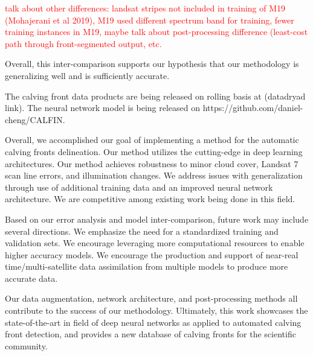 \documentclass[tc, manuscript]{copernicus}
\begin{document}
\textcolor{red}{talk about other differences: landsat stripes not included in training of M19 (Mohajerani et al 2019), M19 used different spectrum band for training, fewer training instances in M19, maybe talk about post-processing difference (least-cost path through front-segmented output, etc.}

Overall, this inter-comparison supports our hypothesis that our methodology is generalizing well and is sufficiently accurate.

The calving front data products are being released on rolling basis at (datadryad link). %
The neural network model is being released on https://github.com/daniel-cheng/CALFIN.

Overall, we accomplished our goal of implementing a method for the automatic calving fronts delineation. Our method utilizes the cutting-edge in deep learning architectures. Our method achieves robustness to minor cloud cover, Landsat 7 scan line errors, and illumination changes. We address issues with generalization through use of additional training data and an improved neural network architecture. We are competitive among existing work being done in this field.  

Based on our error analysis and model inter-comparison, future work may include several directions. We emphasize the need for a standardized training and validation sets. We encourage leveraging more computational resources to enable higher accuracy models. We encourage the production and support of near-real time/multi-satellite data assimilation from multiple models to produce more accurate data.

Our data augmentation, network architecture, and post-processing methods all contribute to the success of our methodology. Ultimately, this work showcases the state-of-the-art in field of deep neural networks as applied to automated calving front detection, and provides a new database of calving fronts for the scientific community.




\end{document}
